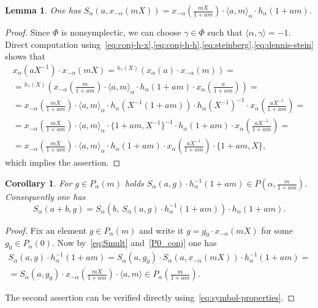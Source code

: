 \documentclass[oneside, 8pt]{amsart}
\newtheorem{corollary}{Corollary}
\newtheorem{lemma}{Lemma}
\theoremstyle{remark}
\theoremstyle{definition}
\numberwithin{equation}{section}
\begin{document}
\begin{lemma} \label{lem:Tulenbayev-formula} 
One has $S_\alpha(a, x_{-\alpha}(mX)) = x_{-\alpha}\left(\tfrac{mX}{1+am}\right) \cdot \langle a, m\rangle_\alpha \cdot h_\alpha(1+am).$
\end{lemma}
\begin{proof} Since $\Phi$ is nonsymplectic, we can choose $\gamma \in \Phi$ such that $\langle \alpha, \gamma \rangle = -1$. Direct computation using~\eqref{eq:conj-h-x},\eqref{eq:conj-h-h},\eqref{eq:steinberg},\eqref{eq:dennis-stein} shows that
 \begin{multline*}
 x_\alpha(aX^{-1}) \cdot x_{-\alpha}(mX) = {}^{h_\gamma(X)}(x_\alpha(a) \cdot x_{-\alpha}(m)) = \\
 = {}^{h_\gamma(X)}\left( x_{-\alpha}\left(\tfrac{m}{1+am}\right) \cdot \langle a, m\rangle_\alpha \cdot h_\alpha(1+am) \cdot x_\alpha\left(\tfrac{a}{1+am}\right) \right) = \\
 = x_{-\alpha}\left(\tfrac{mX}{1+am}\right) \cdot \langle a, m\rangle_\alpha \cdot h_\alpha(X^{-1}(1+am))\cdot h_\alpha(X^{-1})^{-1} \cdot x_{\alpha}\left(\tfrac{aX^{-1}}{1+am}\right) = \\
 = x_{-\alpha}\left(\tfrac{mX}{1+am}\right) \cdot \langle a, m\rangle_\alpha \cdot \{1+am, X^{-1}\}^{-1} \cdot h_\alpha(1+am)\cdot x_{\alpha}\left(\tfrac{aX^{-1}}{1+am}\right) = \\
 = x_{-\alpha}\left(\tfrac{mX}{1+am}\right) \cdot \langle a, m\rangle_\alpha \cdot h_\alpha(1+am) \cdot x_{\alpha}\left(\tfrac{aX^{-1}}{1+am}\right) \cdot \{1+am, X\}, \end{multline*}
which implies the assertion. \end{proof}

\begin{corollary}\label{SR:additivity} For $g \in P_\alpha(m)$ holds $S_\alpha(a, g) \cdot h_\alpha^{-1}(1 + am) \in P(\alpha, \tfrac{m}{1 + am})$.
Consequently one has \[ S_\alpha(a+b, g) = S_\alpha\left(b,\ S_\alpha(a, g) \cdot h_\alpha^{-1}(1 + am)\right)\cdot h_\alpha(1+am). \]\end{corollary} \begin{proof}
Fix an element $g \in P_\alpha(m)$ and write it $g = g_0 \cdot x_{-\alpha}(mX)$ for some $g_0 \in P_\alpha(0)$.
Now by~\eqref{eq:Smult} and~\cref{P0_conj} one has
\begin{multline} \nonumber S_\alpha(a, g) \cdot h_{\alpha}^{-1}(1+am) = S_\alpha(a, g_0) \cdot S_\alpha(a, x_{-\alpha}(mX)) \cdot h_{\alpha}^{-1}(1+am) = 
\\ = S_\alpha(a, g_0) \cdot x_{-\alpha}\left(\tfrac{mX}{1+am}\right) \cdot\langle a, m \rangle \in P_\alpha\left(\tfrac{m}{1+am}\right). \end{multline}

The second assertion can be verified directly using~\eqref{eq:symbol-properties}. \end{proof}
\end{document}
